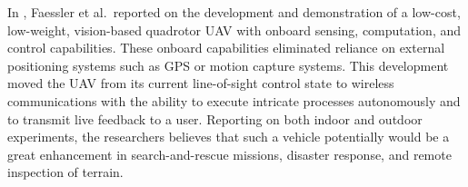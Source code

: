 In \cite{Faessler2016}, Faessler et al.\ reported on the development and demonstration of a low-cost, low-weight, vision-based quadrotor UAV with onboard sensing, computation, and control capabilities. These onboard capabilities eliminated reliance on external positioning systems such as GPS or motion capture systems. This development moved the UAV from its current line-of-sight control state to wireless communications with the ability to execute intricate processes autonomously and to transmit live feedback to a user. Reporting on both indoor and outdoor experiments, the researchers believes that such a vehicle potentially would be a great enhancement in search-and-rescue missions, disaster response, and remote inspection of terrain. 

